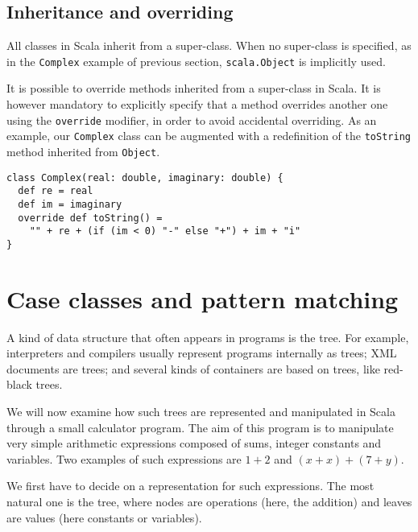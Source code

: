 \documentclass[a4paper,12pt,twoside,titlepage]{article}
\begin{document}
\subsection{Inheritance and overriding}
\label{sec:inheritance}

All classes in Scala inherit from a super-class. When no super-class
is specified, as in the \lstinline?Complex? example of previous section,
\lstinline?scala.Object? is implicitly used.

It is possible to override methods inherited from a super-class in
Scala. It is however mandatory to explicitly specify that a method
overrides another one using the \lstinline?override? modifier, in order to
avoid accidental overriding. As an example, our \lstinline?Complex? class
can be augmented with a redefinition of the \lstinline?toString? method
inherited from \lstinline?Object?.
\begin{lstlisting}
class Complex(real: double, imaginary: double) {
  def re = real
  def im = imaginary
  override def toString() =
    "" + re + (if (im < 0) "-" else "+") + im + "i"
}
\end{lstlisting}

\section{Case classes and pattern matching}
\label{sec:case-classes-pattern}

A kind of data structure that often appears in programs is the tree.
For example, interpreters and compilers usually represent programs
internally as trees; XML documents are trees; and several kinds of
containers are based on trees, like red-black trees.

We will now examine how such trees are represented and manipulated in
Scala through a small calculator program. The aim of this program is
to manipulate very simple arithmetic expressions composed of sums,
integer constants and variables. Two examples of such expressions are
$1+2$ and $(x+x)+(7+y)$.

We first have to decide on a representation for such expressions. The
most natural one is the tree, where nodes are operations (here, the
addition) and leaves are values (here constants or variables).
\end{document}
